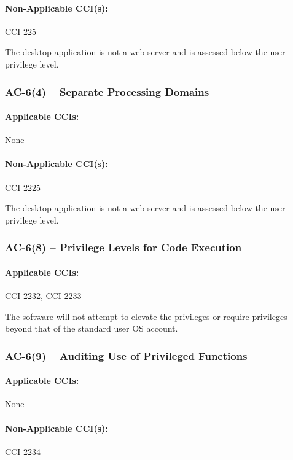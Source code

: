 \documentclass[letterpaper, 10pt, twoside]{article}
\begin{document}
\paragraph{Non-Applicable CCI(s):} CCI-225

The desktop application is not a web server and is assessed below the user-privilege level.

\subsubsection{AC-6(4) -- Separate Processing Domains}

\paragraph{Applicable CCIs:} None

\paragraph{Non-Applicable CCI(s):} CCI-2225

The desktop application is not a web server and is assessed below the user-privilege level.

\subsubsection{AC-6(8) -- Privilege Levels for Code Execution}

\paragraph{Applicable CCIs:} CCI-2232, CCI-2233

The software will not attempt to elevate the privileges or require privileges beyond that of the standard user OS account.

\subsubsection{AC-6(9) -- Auditing Use of Privileged Functions}

\paragraph{Applicable CCIs:} None

\paragraph{Non-Applicable CCI(s):} CCI-2234
\end{document}
